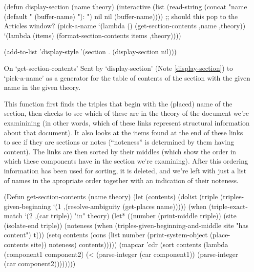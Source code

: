 \begin{elisp}
(defun display-section (name theory)
  (interactive (list (read-string
                      (concat
                       "name (default "
                       (buffer-name) "): ")
                      nil nil (buffer-name))))
  ;; should this pop to the Articles window?
  (pick-a-name `(lambda ()
                  (get-section-contents
                   ,name ,theory))
               `(lambda (items)
                  (format-section-contents
                   items ,theory))))

(add-to-list 'display-style
             '(section . (display-section
                          nil)))
\end{elisp}

\begin{notate}{On `get-section-contents'} \label{get-section-contents}
Sent by `display-section' (Note \ref{display-section})
to `pick-a-name' as a generator for the table of contents
of the section with the given name in the given theory.

This function first finds the triples that begin with the
(placed) name of the section, then checks to see which of
these are in the theory of the document we're examinining
(in other words, which of these links represent structural
information about that document).  It also looks at the
items found at the end of these links to see if they are
sections or notes (``noteness'' is determined by them
having content).  The links are then sorted by their
middles (which show the order in which these components
have in the section we're examining).  After this ordering
information has been used for sorting, it is deleted, and
we're left with just a list of names in the apropriate
order together with an indication of their noteness.
\end{notate}

\begin{elisp}
(Defun get-section-contents (name theory)
  (let (contents)
    (dolist (triple (triples-given-beginning
                     `(1 ,(resolve-ambiguity
                           (get-places name)))))
      (when (triple-exact-match
             `(2 ,(car triple)) "in" theory)
        (let* ((number (print-middle triple))
               (site (isolate-end triple))
               (noteness
                (when (triples-given-beginning-and-middle
                       site "has content")
                  t)))
        (setq contents
              (cons (list number
                          (print-system-object
                           (place-contents site))
                          noteness)
                    contents)))))
    (mapcar 'cdr
            (sort contents
                  (lambda (component1 component2)
                    (< (parse-integer (car component1))
                       (parse-integer (car component2))))))))
\end{elisp}


